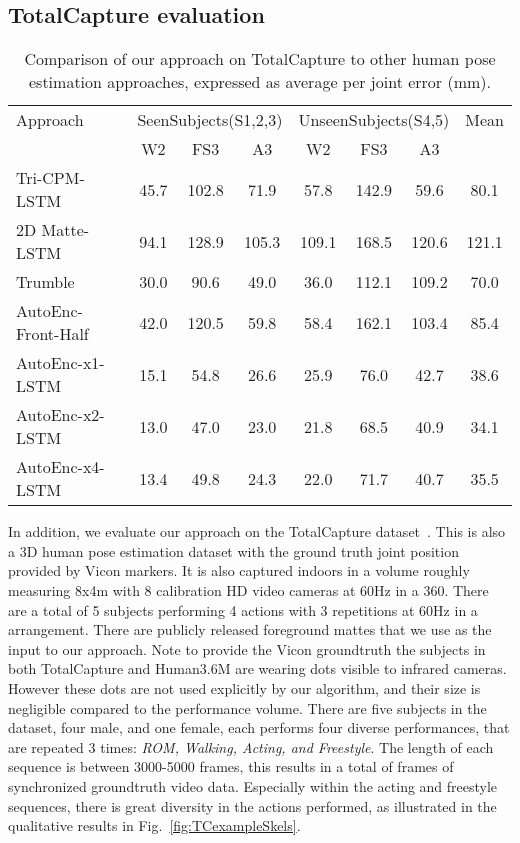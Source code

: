 \documentclass[runningheads]{llncs}
\begin{document}
\subsection{TotalCapture evaluation}
\begin{table}[htb]
\centering
{
\small
\begin{tabular}{lccccccc}
\hline
Approach &\multicolumn{3}{c}{SeenSubjects(S1,2,3)}&\multicolumn{3}{c}{UnseenSubjects(S4,5)} & Mean \\
                                        & W2 & FS3 & A3 & W2 & FS3 & A3 & \\ \hline
Tri-CPM-LSTM~\cite{cao2016realtimeCPM}       & 45.7 &102.8 & 71.9& 57.8 & 142.9 & 59.6 & 80.1 \\ 
2D Matte-LSTM~\cite{TrumbleCVMP2DConvNet}& 94.1 &128.9  &105.3 & 109.1& 168.5&120.6&121.1 \\ 
Trumble~\cite{trumble_total_2017} & 30.0 & 90.6 & 49.0 & 36.0 & 112.1 & 109.2 & 70.0 \\ \hline
AutoEnc-Front-Half                   & 42.0 & 120.5 & 59.8 & 58.4 & 162.1 & 103.4 & 85.4 \\
AutoEnc-x1-LSTM                    & 15.1 & 54.8 & 26.6 & 25.9 & 76.0 & 42.7 & 38.6 \\ 
AutoEnc-x2-LSTM                    & 13.0 & 47.0 & 23.0 & 21.8 & 68.5 & 40.9 & 34.1 \\ 
AutoEnc-x4-LSTM                    & 13.4 & 49.8 & 24.3 & 22.0 & 71.7 & 40.7 & 35.5 \\ \hline
\end{tabular}
}
\caption{Comparison of our approach on  TotalCapture  to other human pose estimation approaches, expressed as average per joint error (mm).}
\label{tab:totalcaptureResults}
\squeezeup
\squeezeup
\end{table}
In addition, we evaluate our approach on the TotalCapture dataset~\cite{trumble_total_2017}. This is also a 3D human pose estimation dataset with the ground truth joint position provided by Vicon markers. It is also captured indoors in a volume roughly measuring 8x4m with 8 calibration HD video cameras at 60Hz in a 360. There are a total of 5 subjects performing 4 actions with 3 repetitions at 60Hz in a  arrangement. There are publicly released foreground mattes that we use as the input to our approach. Note to provide the Vicon groundtruth the subjects in both TotalCapture and Human3.6M are wearing dots visible to infrared cameras. However these dots are not used explicitly by our algorithm, and their size is negligible compared to the performance volume. There are five subjects in the dataset, four male, and one female, each performs four diverse performances, that are repeated 3 times: \emph{ROM, Walking, Acting, and Freestyle}. The length of each sequence is between 3000-5000 frames, this results in a total of  frames of synchronized groundtruth video data. Especially within the acting and freestyle sequences, there is great diversity in the actions performed, as illustrated in the qualitative results in Fig.~\ref{fig:TCexampleSkels}. 
\end{document}
